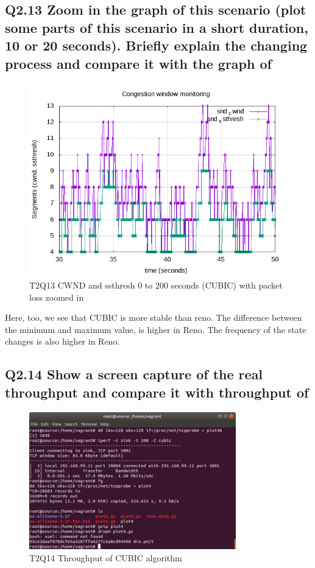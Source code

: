 \documentclass{article}
\begin{document}
\subsection{Q2.13 Zoom in the graph of this scenario (plot some parts of this scenario in a short duration, 10 or 20 seconds). Briefly explain the changing process and compare it with the graph of}

\begin{figure}[H]
	\includegraphics{lab1-group1-task2-question13.png}
	\caption{T2Q13 CWND and ssthresh 0 to 200 seconds (CUBIC) with packet loss zoomed in}
\end{figure}

Here, too, we see that CUBIC is more stable than reno. The difference between
the minimum and maximum value, is higher in Reno. The frequency of the state
changes is also higher in Reno.


\subsection{Q2.14 Show a screen capture of the real throughput and compare it with throughput of}

\begin{figure}[H]
	\includegraphics[width=0.8\textwidth]{lab1-group1-task2-question14.png}
	\caption{T2Q14 Throughput of CUBIC algorithm}
\end{figure}
\end{document}
